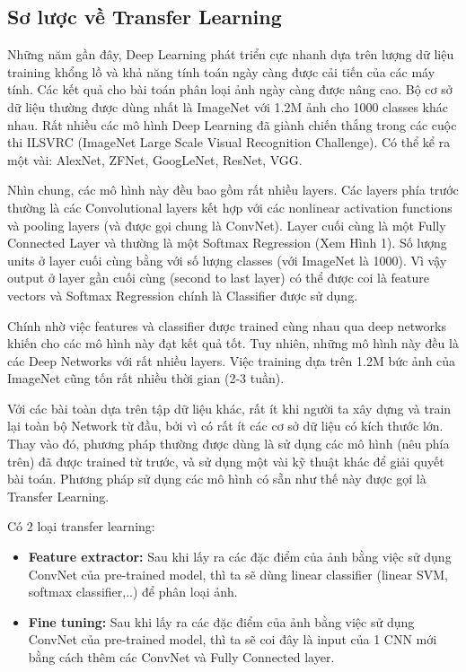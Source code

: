 \documentclass[a4paper, 12pt]{report}
\begin{document}
\subsection{Sơ lược về Transfer Learning}
Những năm gần đây, Deep Learning phát triển cực nhanh dựa trên lượng dữ liệu training khổng lồ và khả năng tính toán ngày càng được cải tiến của các máy tính. Các kết quả cho bài toán phân loại ảnh ngày càng được nâng cao. Bộ cơ sở dữ liệu thường được dùng nhất là ImageNet với 1.2M ảnh cho 1000 classes khác nhau. Rất nhiều các mô hình Deep Learning đã giành chiến thắng trong các cuộc thi ILSVRC (ImageNet Large Scale Visual Recognition Challenge). Có thể kể ra một vài: AlexNet, ZFNet, GoogLeNet, ResNet, VGG.\par
Nhìn chung, các mô hình này đều bao gồm rất nhiều layers. Các layers phía trước thường là các Convolutional layers kết hợp với các nonlinear activation functions và pooling layers (và được gọi chung là ConvNet). Layer cuối cùng là một Fully Connected Layer và thường là một Softmax Regression (Xem Hình 1). Số lượng units ở layer cuối cùng bằng với số lượng classes (với ImageNet là 1000). Vì vậy output ở layer gần cuối cùng (second to last layer) có thể được coi là feature vectors và Softmax Regression chính là Classifier được sử dụng.\par
Chính nhờ việc features và classifier được trained cùng nhau qua deep networks khiến cho các mô hình này đạt kết quả tốt. Tuy nhiên, những mô hình này đều là các Deep Networks với rất nhiều layers. Việc training dựa trên 1.2M bức ảnh của ImageNet cũng tốn rất nhiều thời gian (2-3 tuần).\par
Với các bài toàn dựa trên tập dữ liệu khác, rất ít khi người ta xây dựng và train lại toàn bộ Network từ đầu, bởi vì có rất ít các cơ sở dữ liệu có kích thước lớn. Thay vào đó, phương pháp thường được dùng là sử dụng các mô hình (nêu phía trên) đã được trained từ trước, và sử dụng một vài kỹ thuật khác để giải quyết bài toán. Phương pháp sử dụng các mô hình có sẵn như thế này được gọi là Transfer Learning.\par
Có 2 loại transfer learning:
\begin{itemize}
	\item \textbf{Feature extractor:} Sau khi lấy ra các đặc điểm của ảnh bằng việc sử dụng ConvNet của pre-trained model, thì ta sẽ dùng linear classifier (linear SVM, softmax classifier,..) để phân loại ảnh.
	\item \textbf{Fine tuning:} Sau khi lấy ra các đặc điểm của ảnh bằng việc sử dụng ConvNet của pre-trained model, thì ta sẽ coi đây là input của 1 CNN mới bằng cách thêm các ConvNet và Fully Connected layer. 
\end{itemize}
\end{document}
